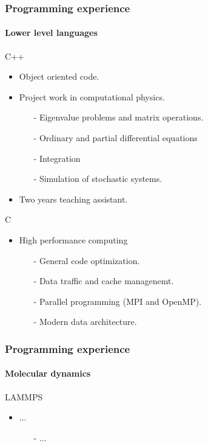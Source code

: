 \documentclass[
	10pt, %
]{beamer}
\begin{document}
\begin{frame}
	\frametitle{Programming experience}
	\framesubtitle{Lower level languages}

	{\large C++} 
	\begin{itemize}
		\item Object oriented code.
		\item Project work in computational physics.
		\begin{itemize}
			\item [-] Eigenvalue problems and matrix operations.
			\item [-] Ordinary and partial differential equations
			\item [-] Integration 
			\item [-] Simulation of stochastic systems.
		\end{itemize}
		\item Two years teaching assistant.
	\end{itemize}


	{\large C} 
	\begin{itemize}
		\item High performance computing 
		\begin{itemize}
			\item [-] General code optimization.
			\item [-] Data traffic and cache managenemt.
			\item [-] Parallel programming (MPI and OpenMP).
			\item [-] Modern data architecture.
		\end{itemize}
	\end{itemize}

\end{frame}


\begin{frame}
	\frametitle{Programming experience}
	\framesubtitle{Molecular dynamics}

	{\large LAMMPS} 
	\begin{itemize}
		\item ...
		\begin{itemize}
			\item [-] ...
		\end{itemize}
	\end{itemize}


\end{frame}
\end{document}
